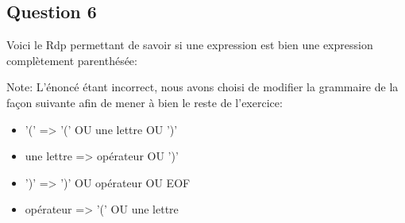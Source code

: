 \subsection{Question 6}
Voici le Rdp permettant de savoir si une expression est bien une expression complètement parenthésée:

Note: L'énoncé étant incorrect, nous avons choisi de modifier la grammaire de la façon suivante afin de mener à bien le reste de l'exercice:

\begin{itemize}
    \item '(' => '(' OU une lettre OU ')'
    \item une lettre => opérateur OU ')'
    \item ')' => ')' OU opérateur OU EOF
    \item opérateur => '(' OU une lettre
\end{itemize}

